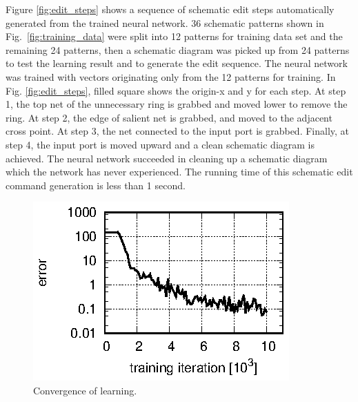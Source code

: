 \documentclass[twocolumn]{article}
\begin{document}
Figure \ref{fig:edit_steps} shows a sequence of schematic edit steps
automatically generated from the trained neural network.
36 schematic patterns shown in Fig.\ \ref{fig:training_data}
were split into 12 patterns for training data set
and the remaining 24 patterns,
then a schematic diagram was picked up
from 24 patterns to test the learning result
and to generate the edit sequence.
The neural network was trained with vectors
originating only from the 12 patterns for training.
In Fig. \ref{fig:edit_steps}, filled square shows the origin-x and y
for each step.
At step 1, the top net of the unnecessary ring is grabbed and moved lower
to remove the ring.
At step 2, the edge of salient net is grabbed,
and moved to the adjacent cross point.
At step 3, the net connected to the input port is grabbed.
Finally, at step 4, the input port is moved upward
and a clean schematic diagram is achieved.
The neural network succeeded in cleaning up a schematic diagram
which the network has never experienced.
The running time of this schematic edit command generation
is less than 1 second.

\begin{figure}[!tp]
 \begin{center}
  \begin{minipage}{\hsize}
   \includegraphics[width=\hsize]{fig/errors_02.eps}
   \caption{Convergence of learning.}
   \label{fig:errors}
  \end{minipage}
 \end{center}
\end{figure}
\end{document}
